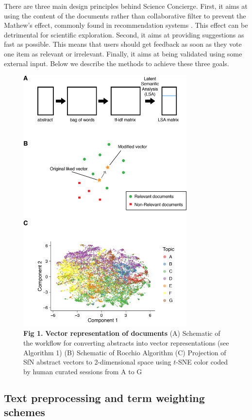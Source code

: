 \documentclass[a4paper]{article}
\begin{document}
There are three main design principles behind Science Concierge. First, it aims at using the content of the documents rather than collaborative filter to prevent the Mathew's effect, commonly found in recommendation systems  \cite{petersen2011quantitative}. This effect can be detrimental for scientific exploration. Second, it aims at providing  suggestions as fast as possible. This means that users should get feedback as soon as they vote one item as relevant or irrelevant. Finally, it aims at being validated using some external input. Below we describe the methods to achieve these three goals.


\begin{figure}[!ht]
\centering
\includegraphics[width=3.5in]{algorithm_flow}
\caption*{\textbf{Fig 1.} \textbf{Vector representation of documents} (A) Schematic of the workflow for converting abstracts into vector representations (see Algorithm 1) (B) Schematic of Rocchio Algorithm (C) Projection of SfN abstract vectors to 2-dimensional space using $t$-SNE color coded by human curated sessions from A to G}
\end{figure}


\subsection{Text preprocessing and term weighting schemes}
\end{document}
